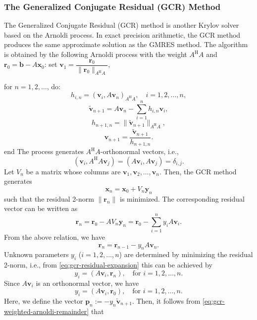 \subsubsection{{The Generalized Conjugate Residual (GCR) Method}}\label{subsec:gcr-method}
{The Generalized Conjugate Residual (GCR) method  is another Krylov solver based on the Arnoldi process. In exact precision arithmetic, the GCR method produces the same approximate solution as the GMRES method. The algorithm is obtained by the following Arnoldi process with the weight $A^{\mathrm H}A$ and $\bm r_0=\bm b-A\bm x_0$:}
{set} $\bm v_1=\dfrac{\bm r_0}{\|\bm r_0\|_{A^{\mathrm H}A}}$,\par
{for $n=1,2,\ldots$, do:}
\[h_{i,n}=(\bm v_i,A\bm v_n)_{A^{\mathrm H}A},\quad i=1,2,\ldots,n,\]
\begin{equation}\label{eq:gcr-weighted-arnoldi-remainder}\widetilde{\bm v}_{n+1}=A\bm v_n-\sum_{i=1}^nh_{i,n}\bm v_i,\end{equation}
\[h_{n+1,n}=\|\widetilde{\bm v}_{n+1}\|_{A^{\mathrm H}A},\]
\begin{equation}\label{eq:gcr-weighted-arnoldi-normalization}\bm v_{n+1}=\frac{\widetilde{\bm v}_{n+1}}{h_{n+1,n}}.\end{equation}
{end}
{The process generates $A^{\mathrm H}A$-orthonormal vectors, i.e.,}
\[(\bm v_i,A^{\mathrm H}A\bm v_j)=(A\bm v_i,A\bm v_j)=\delta_{i,j}.\]
{Let $V_n$ be a matrix whose columns are $\bm v_1,\bm v_2,\ldots,\bm v_n$. Then, the GCR method generates}
\[\bm x_n=\bm x_0+V_n\bm y_n\]
{such that the residual 2-norm $\|\bm r_n\|$ is minimized. The corresponding residual vector can be written as}
\begin{equation}\label{eq:gcr-residual-expansion}\bm r_n=\bm r_0-AV_n\bm y_n=\bm r_0-\sum_{i=1}^ny_iA\bm v_i.\end{equation}
{From the above relation, we have}
\begin{equation}\label{eq:gcr-residual-basis-update}\bm r_n=\bm r_{n-1}-y_nA\bm v_n.\end{equation}
{Unknown parameters $y_i$ ($i=1,2,\ldots,n$) are determined by minimizing the residual 2-norm, i.e., from \eqref{eq:gcr-residual-expansion} this can be achieved by}
\[y_i=(A\bm v_i,\bm r_n),\quad\text{for }i=1,2,\ldots,n.\]
{Since $A\bm v_i$ is an orthonormal vector, we have}
\[y_i=(A\bm v_i,\bm r_0),\quad\text{for }i=1,2,\ldots,n.\]
{Here, we define the vector $\bm p_n:=-y_n\widetilde{\bm v}_{n+1}$. Then, it follows from \eqref{eq:gcr-weighted-arnoldi-remainder} that}
